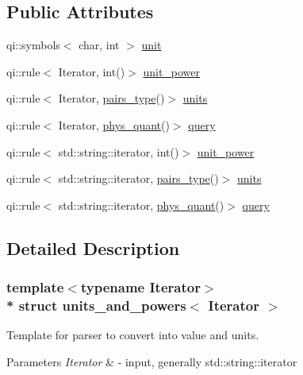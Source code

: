 \subsection*{Public Attributes}
\begin{DoxyCompactItemize}
\item 
qi\+::symbols$<$ char, int $>$ \hyperlink{structunits__and__powers_a83c10d174beef086f2d95070784cde1e}{unit}
\item 
qi\+::rule$<$ Iterator, int()$>$ \hyperlink{structunits__and__powers_a90d733fe21d7d5efc2a599b0ab6df131}{unit\+\_\+power}
\item 
qi\+::rule$<$ Iterator, \hyperlink{parser_8hpp_ab598806586272ab27a10406c3b8436fe}{pairs\+\_\+type}()$>$ \hyperlink{structunits__and__powers_ab2d482b29c10f220fbbb3bbaf79d63ef}{units}
\item 
qi\+::rule$<$ Iterator, \hyperlink{parser_8hpp_a76d816dc60daad0ab1c3c7b1dc7906d2}{phys\+\_\+quant}()$>$ \hyperlink{structunits__and__powers_a9a88ef937627d35522c4017b9efd59ba}{query}
\item 
qi\+::rule$<$ std\+::string\+::iterator, int()$>$ \hyperlink{structunits__and__powers_a986afcb2d8eb3142b4ec0a662a1b5cc5}{unit\+\_\+power}
\item 
qi\+::rule$<$ std\+::string\+::iterator, \hyperlink{parser_8hpp_ab598806586272ab27a10406c3b8436fe}{pairs\+\_\+type}()$>$ \hyperlink{structunits__and__powers_ad6ac559c4efd891700a991703319db57}{units}
\item 
qi\+::rule$<$ std\+::string\+::iterator, \hyperlink{parser_8hpp_a76d816dc60daad0ab1c3c7b1dc7906d2}{phys\+\_\+quant}()$>$ \hyperlink{structunits__and__powers_a1c6b2c6fb390a9c092143ba650add70d}{query}
\end{DoxyCompactItemize}


\subsection{Detailed Description}
\subsubsection*{template$<$typename Iterator$>$\\*
struct units\+\_\+and\+\_\+powers$<$ Iterator $>$}

Template for parser to convert into value and units. 
\begin{DoxyParams}{Parameters}
{\em Iterator} & -\/ input, generally std\+::string\+::iterator \\
\hline
\end{DoxyParams}


